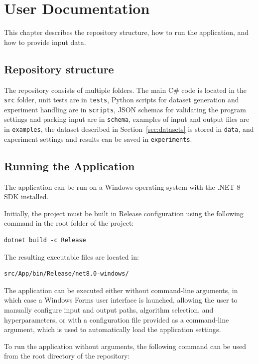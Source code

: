 \chapter{User Documentation}
\label{app:user}

This chapter describes the repository structure, how to run the application, and how to provide input data.

\section{Repository structure}

The repository consists of multiple folders. The main C\# code is located in the \texttt{src} folder, 
unit tests are in \texttt{tests}, 
Python scripts for dataset generation and experiment handling are in \texttt{scripts}, 
JSON schemas for validating the program settings and packing input are in \texttt{schema}, 
examples of input and output files are in \texttt{examples}, 
the dataset described in Section~\ref{sec:datasets} is stored in \texttt{data}, 
and experiment settings and results can be saved in \texttt{experiments}.

\section{Running the Application}

The application can be run on a Windows operating system with the .NET 8 SDK installed.

Initially, the project must be built in Release configuration using the following command in the root folder of the project:

\begin{verbatim}
dotnet build -c Release
\end{verbatim}

The resulting executable files are located in:

\begin{verbatim}
src/App/bin/Release/net8.0-windows/
\end{verbatim}

The application can be executed either without command-line arguments, in which case a Windows Forms user interface is launched, 
allowing the user to manually configure input and output paths, algorithm selection, and hyperparameters, 
or with a configuration file provided as a command-line argument, which is used to automatically load the application settings.

To run the application without arguments, the following command can be used from the root directory of the repository:

